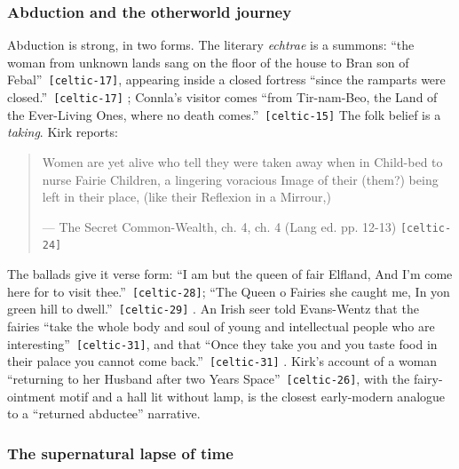 \documentclass[11pt,a4paper]{article}
\newcommand{\pid}[1]{\texttt{\small #1}}
\begin{document}
\subsubsection{Abduction and the otherworld journey}

Abduction is strong, in two forms. The literary \emph{echtrae} is a summons: \enquote{the woman from unknown lands sang on the floor of the house to Bran son of Febal}~\pid{[celtic-17]}, appearing inside a closed fortress \enquote{since the ramparts were closed.}~\pid{[celtic-17]} \parencite{meyer1895}; Connla's visitor comes \enquote{from Tir-nam-Beo, the Land of the Ever-Living Ones, where no death comes.}~\pid{[celtic-15]} The folk belief is a \emph{taking}. Kirk reports: 
\begin{quote}\small Women are yet alive who tell they were taken away when in Child-bed to nurse Fairie Children, a lingering voracious Image of their (them?) being left in their place, (like their Reflexion in a Mirrour,)\par\hfill{\footnotesize --- The Secret Common-Wealth, ch. 4, ch. 4 (Lang ed. pp. 12-13) \pid{[celtic-24]}}\end{quote}
 The ballads give it verse form: \enquote{I am but the queen of fair Elfland, And I'm come here for to visit thee.}~\pid{[celtic-28]}; \enquote{The Queen o Fairies she caught me, In yon green hill to dwell.}~\pid{[celtic-29]} \parencite{child1882}. An Irish seer told Evans-Wentz that the fairies \enquote{take the whole body and soul of young and intellectual people who are interesting}~\pid{[celtic-31]}, and that \enquote{Once they take you and you taste food in their palace you cannot come back.}~\pid{[celtic-31]} \parencite{evanswentz1911}. Kirk's account of a woman \enquote{returning to her Husband after two Years Space}~\pid{[celtic-26]}, with the fairy-ointment motif and a hall lit without lamp, is the closest early-modern analogue to a ``returned abductee'' narrative.

\subsubsection{The supernatural lapse of time}
\end{document}
